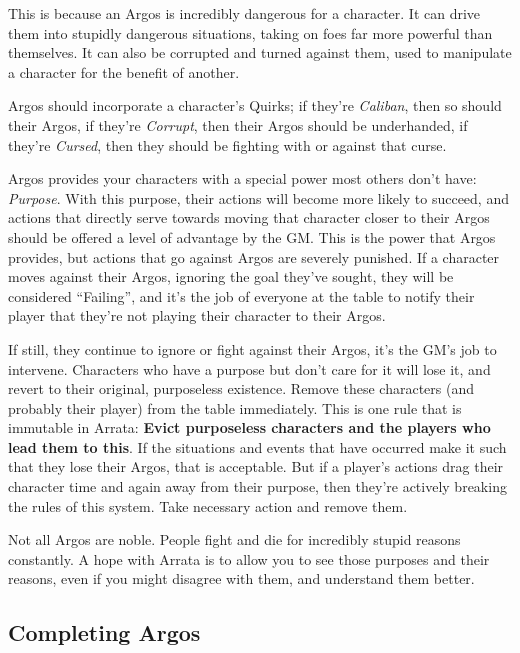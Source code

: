 \documentclass[../main.tex]{subfiles}
\begin{document}
        This is because an Argos is incredibly dangerous for a character. It can drive them into stupidly dangerous situations, taking on foes far more powerful than themselves. It can also be corrupted and turned against them, used to manipulate a character for the benefit of another.

        Argos should incorporate a character's Quirks; if they're \emph{Caliban}, then so should their Argos, if they're \emph{Corrupt}, then their Argos should be underhanded, if they're \emph{Cursed}, then they should be fighting with or against that curse.

        Argos provides your characters with a special power most others don't have: \emph{Purpose}. With this purpose, their actions will become more likely to succeed, and actions that directly serve towards moving that character closer to their Argos should be offered a level of advantage by the GM. This is the power that Argos provides, but actions that go against Argos are severely punished. If a character moves against their Argos, ignoring the goal they've sought, they will be considered ``Failing'', and it's the job of everyone at the table to notify their player that they're not playing their character to their Argos.

        If still, they continue to ignore or fight against their Argos, it's the GM's job to intervene. Characters who have a purpose but don't care for it will lose it, and revert to their original, purposeless existence. Remove these characters (and probably their player) from the table immediately. This is one rule that is immutable in Arrata: \textbf{Evict purposeless characters and the players who lead them to this}. If the situations and events that have occurred make it such that they lose their Argos, that is acceptable. But if a player's actions drag their character time and again away from their purpose, then they're actively breaking the rules of this system. Take necessary action and remove them.

        Not all Argos are noble. People fight and die for incredibly stupid reasons constantly. A hope with Arrata is to allow you to see those purposes and their reasons, even if you might disagree with them, and understand them better.

    \subsection{Completing Argos}
\end{document}
